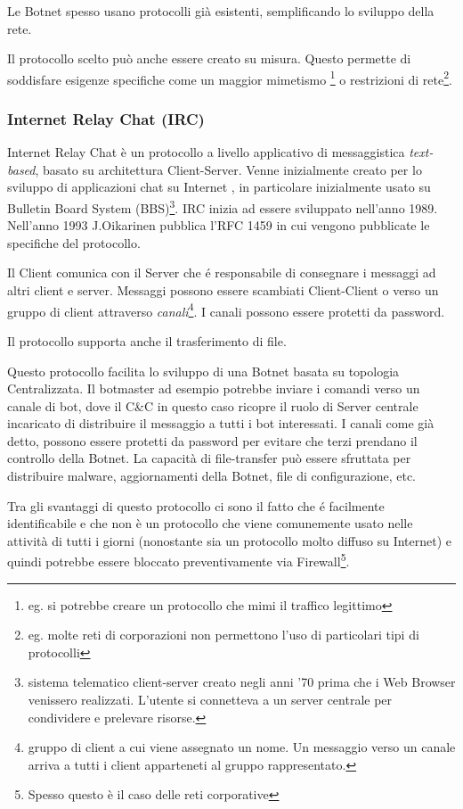 Le Botnet spesso usano protocolli già esistenti, semplificando lo sviluppo della rete.

Il protocollo scelto può anche essere creato su misura. Questo permette di soddisfare  esigenze specifiche come un maggior mimetismo \footnote{eg. si potrebbe creare un protocollo che mimi il traffico legittimo}  o restrizioni di rete\footnote{eg. molte reti di corporazioni non permettono l'uso di particolari tipi di protocolli}.

\subsubsection{Internet Relay Chat (IRC)}
\label{IRC}
Internet Relay Chat  è un protocollo a livello applicativo di messaggistica \textit{text-based}, basato su architettura Client-Server. Venne inizialmente creato  per lo sviluppo di applicazioni chat su Internet \cite{rfc1459}, in particolare inizialmente usato su Bulletin Board System (BBS)\footnote{sistema telematico client-server creato negli anni '70 prima che i Web Browser venissero realizzati. L'utente si connetteva a un server centrale per condividere e prelevare risorse.}.
IRC inizia ad essere sviluppato nell'anno 1989. Nell'anno 1993 J.Oikarinen pubblica l'RFC 1459 in cui vengono pubblicate le specifiche del protocollo.

Il Client comunica con il Server che é responsabile di consegnare i messaggi ad altri client e server.
Messaggi possono essere scambiati  Client-Client o verso un gruppo di client attraverso \textit{canali}\footnote{gruppo di client a cui viene assegnato un nome. Un messaggio verso un canale arriva a tutti i client apparteneti al gruppo rappresentato.}. I canali possono essere protetti da password. 

Il protocollo supporta anche il trasferimento di file.

Questo protocollo facilita lo sviluppo di una Botnet basata su topologia Centralizzata. Il botmaster ad esempio potrebbe inviare i comandi verso un canale di bot, dove il C\&C in questo caso ricopre il ruolo di Server centrale incaricato di distribuire il messaggio a tutti i bot interessati. I canali come già detto, possono essere protetti da password per evitare che terzi prendano il controllo della Botnet. La capacità di file-transfer può essere sfruttata per distribuire malware, aggiornamenti della Botnet, file di configurazione, etc.

Tra gli svantaggi di questo protocollo ci sono il fatto che é facilmente identificabile e che non è un protocollo che viene comunemente usato nelle attività di tutti i giorni (nonostante sia un protocollo molto diffuso su Internet) e quindi potrebbe essere bloccato preventivamente via Firewall\footnote{Spesso questo è il caso delle reti corporative}.

